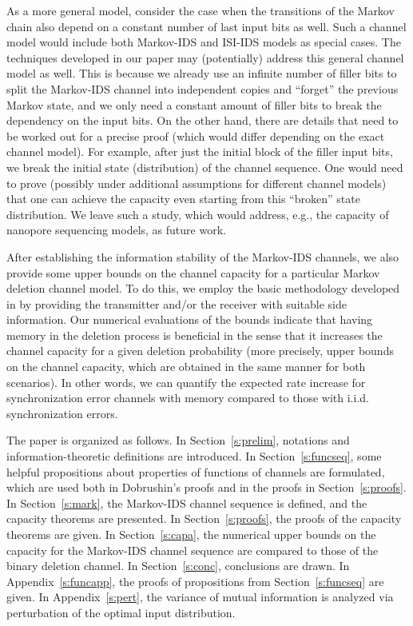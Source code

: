 \documentclass[journal, twocol]{IEEEtran}
\begin{document}
As a more general model, consider the case when the transitions of the Markov chain also depend on a constant number of last input bits as well.
Such a channel model would include both Markov-IDS and ISI-IDS models as special cases. The techniques developed in our paper may (potentially) address this general channel model as well. This is because we already use an infinite number of filler bits to split the Markov-IDS channel into independent copies and ``forget'' the previous Markov state, and we only need a constant amount of filler bits to break the dependency on the input bits. On the other hand, there are details that need to be worked out for a precise proof (which would differ depending on the exact channel model). For example, after just the initial block of the filler input bits, we break the initial state (distribution) of the channel sequence.
One would need to prove (possibly under additional assumptions for different channel models) that one can achieve the capacity even starting from this ``broken'' state distribution. We leave such a study, which would address, e.g., the capacity of nanopore sequencing models, as future work. 

After establishing the information stability of the Markov-IDS channels, we also provide some upper bounds on the channel capacity for a particular Markov deletion channel model. To do this, we employ the basic methodology developed in \cite{fertonani11bounds} by providing the transmitter and/or the receiver with suitable side information. Our numerical evaluations of the bounds indicate that having memory in the deletion process is beneficial in the sense that it increases the channel capacity for a given deletion probability (more precisely, upper bounds on the channel capacity, which are obtained in the same manner for both scenarios). In other words, we can quantify the expected rate increase for synchronization error channels with memory compared to those with i.i.d. synchronization errors.

The paper is organized as follows.
In Section~\ref{s:prelim}, notations and information-theoretic definitions are introduced.
In Section~\ref{s:funcseq}, some helpful propositions about properties of functions of channels are formulated, which are used both in Dobrushin's proofs and in the proofs in Section~\ref{s:proofs}.
In Section~\ref{s:mark}, the Markov-IDS channel sequence is defined, and the capacity theorems are presented.
In Section~\ref{s:proofs}, the proofs of the capacity theorems are given.
In Section~\ref{s:capa}, the numerical upper bounds on the capacity for the Markov-IDS channel sequence are compared to those of the binary deletion channel.
In Section~\ref{s:conc}, conclusions are drawn.
In Appendix~\ref{s:funcapp}, the proofs of propositions from Section~\ref{s:funcseq} are given.
In Appendix~\ref{s:pert}, the variance of mutual information is analyzed via perturbation of the optimal input distribution.
\end{document}
